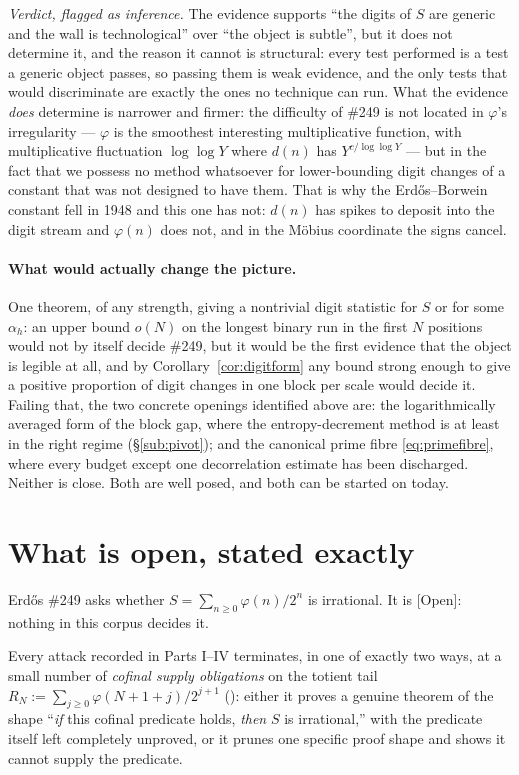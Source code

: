 \documentclass[11pt]{article}
\theoremstyle{plain}
\theoremstyle{definition}
\theoremstyle{remark}
\newcommand{\lean}[2]{\leanlink{#2}}
\newcommand{\ev}[1]{{\small\textsf{[#1]}}\xspace}
\begin{document}
\emph{Verdict, flagged as inference.} The evidence supports ``the digits of
$S$ are generic and the wall is technological'' over ``the object is
subtle'', but it does not determine it, and the reason it cannot is
structural: every test performed is a test a generic object passes, so
passing them is weak evidence, and the only tests that would discriminate are
exactly the ones no technique can run. What the evidence \emph{does} determine
is narrower and firmer: the difficulty of \#249 is not located in $\varphi$'s
irregularity --- $\varphi$ is the smoothest interesting multiplicative
function, with multiplicative fluctuation $\log\log Y$ where $d(n)$ has
$Y^{c/\log\log Y}$ --- but in the fact that we possess no method whatsoever
for lower-bounding digit changes of a constant that was not designed to have
them. That is why the Erd\H{o}s--Borwein constant fell in 1948 and this one
has not: $d(n)$ has spikes to deposit into the digit stream and $\varphi(n)$
does not, and in the M\"obius coordinate the signs cancel.

\paragraph{What would actually change the picture.}
One theorem, of any strength, giving a nontrivial digit statistic for $S$ or
for some $\alpha_h$: an upper bound $o(N)$ on the longest binary run in the
first $N$ positions would not by itself decide \#249, but it would be the
first evidence that the object is legible at all, and by
Corollary~\ref{cor:digitform} any bound strong enough to give a positive
proportion of digit changes in one block per scale would decide it. Failing
that, the two concrete openings identified above are: the logarithmically
averaged form of the block gap, where the entropy-decrement method is at
least in the right regime (\S\ref{sub:pivot}); and the canonical prime fibre
\eqref{eq:primefibre}, where every budget except one decorrelation estimate
has been discharged. Neither is close. Both are well posed, and both can be
started on today.
\section{What is open, stated exactly}

Erdős \#249 asks whether $S = \sum_{n\ge 0} \varphi(n)/2^n$ is irrational. It is
\ev{Open}: nothing in this corpus decides it.

Every attack recorded in Parts
I--IV terminates, in one of exactly two ways, at a small number of
\emph{cofinal supply obligations} on the totient tail
$R_N := \sum_{j\ge 0}\varphi(N+1+j)/2^{j+1}$
(\lean{Erdos249257.TotientTailPeriodKiller.totientTail}{TotientTailPeriodKiller.lean:57}):
either it proves a genuine theorem of the shape ``\emph{if} this cofinal
predicate holds, \emph{then} $S$ is irrational,'' with the predicate itself
left completely unproved, or it prunes one specific proof shape and shows it
cannot supply the predicate.
\end{document}
